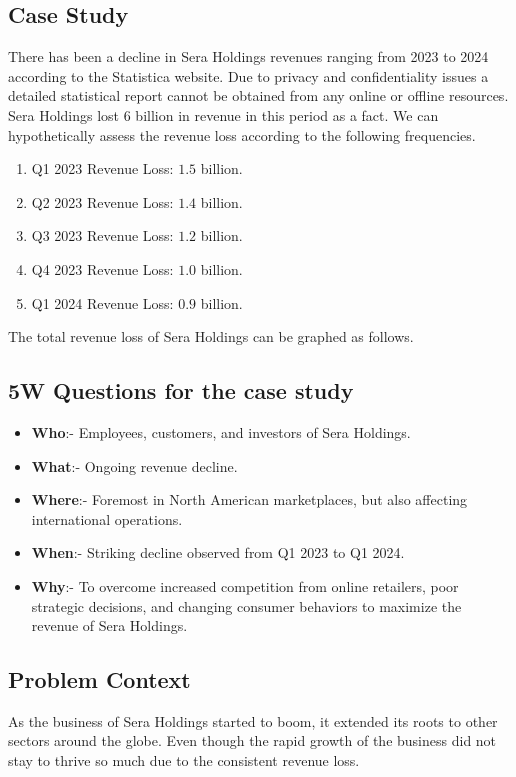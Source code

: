 \documentclass[12pt,a4Paper]{article}
\begin{document}
\subsection{Case Study}
There has been a decline in Sera Holdings revenues ranging from 2023 to 2024 according to the Statistica website. Due to privacy and confidentiality issues a detailed statistical report cannot be obtained from any online or offline resources. Sera Holdings lost 6 billion in revenue in this period as a fact. We can hypothetically assess the revenue loss according to the following frequencies. 
\begin{enumerate}
\item Q1 2023 Revenue Loss: $1.5$ billion.
\item Q2 2023 Revenue Loss: $1.4$ billion.
\item Q3 2023 Revenue Loss: $1.2$ billion.
\item Q4 2023 Revenue Loss: $1.0$ billion.
\item Q1 2024 Revenue Loss: $0.9$ billion.
\end{enumerate}
The total revenue loss of Sera Holdings can be graphed as follows.
\newpage 
\subsection{5W Questions for the case study}
\begin{itemize}
\item \textbf{Who}:- Employees, customers, and investors of Sera Holdings.
\item \textbf{What}:- Ongoing revenue decline.
\item \textbf{Where}:- Foremost in North American marketplaces, but also affecting international operations.
\item \textbf{When}:- Striking decline observed from Q1 2023 to Q1 2024.
\item \textbf{Why}:- To overcome increased competition from online retailers, poor strategic decisions, and changing consumer behaviors to maximize the revenue of Sera Holdings.
\end{itemize}
\subsection{Problem Context}
As the business of Sera Holdings started to boom, it extended its roots to other sectors around the globe. Even though the rapid growth of the business did not stay to thrive so much due to the consistent revenue loss.
\end{document}
